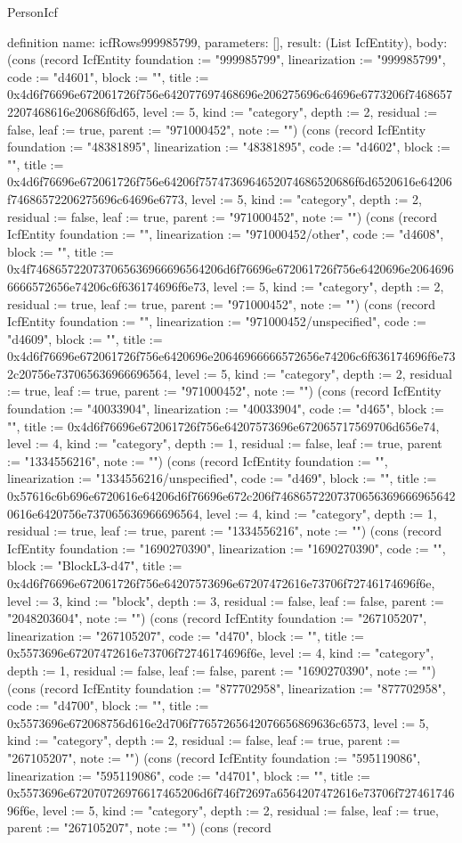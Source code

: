 \begin{lexlean}{PersonIcf}
\begin{semanticmodule}
definition{
  name: icfRows999985799,
  parameters: [],
  result: (List IcfEntity),
  body: (cons (record IcfEntity {foundation := "999985799", linearization := "999985799", code := "d4601", block := "", title := 0x4d6f76696e672061726f756e642077697468696e206275696c64696e6773206f74686572207468616e20686f6d65, level := 5, kind := "category", depth := 2, residual := false, leaf := true, parent := "971000452", note := ""}) (cons (record IcfEntity {foundation := "48381895", linearization := "48381895", code := "d4602", block := "", title := 0x4d6f76696e672061726f756e64206f7574736964652074686520686f6d6520616e64206f74686572206275696c64696e6773, level := 5, kind := "category", depth := 2, residual := false, leaf := true, parent := "971000452", note := ""}) (cons (record IcfEntity {foundation := "", linearization := "971000452/other", code := "d4608", block := "", title := 0x4f7468657220737065636966696564206d6f76696e672061726f756e6420696e20646966666572656e74206c6f636174696f6e73, level := 5, kind := "category", depth := 2, residual := true, leaf := true, parent := "971000452", note := ""}) (cons (record IcfEntity {foundation := "", linearization := "971000452/unspecified", code := "d4609", block := "", title := 0x4d6f76696e672061726f756e6420696e20646966666572656e74206c6f636174696f6e732c20756e737065636966696564, level := 5, kind := "category", depth := 2, residual := true, leaf := true, parent := "971000452", note := ""}) (cons (record IcfEntity {foundation := "40033904", linearization := "40033904", code := "d465", block := "", title := 0x4d6f76696e672061726f756e64207573696e672065717569706d656e74, level := 4, kind := "category", depth := 1, residual := false, leaf := true, parent := "1334556216", note := ""}) (cons (record IcfEntity {foundation := "", linearization := "1334556216/unspecified", code := "d469", block := "", title := 0x57616c6b696e6720616e64206d6f76696e672c206f746865722073706563696669656420616e6420756e737065636966696564, level := 4, kind := "category", depth := 1, residual := true, leaf := true, parent := "1334556216", note := ""}) (cons (record IcfEntity {foundation := "1690270390", linearization := "1690270390", code := "", block := "BlockL3-d47", title := 0x4d6f76696e672061726f756e64207573696e67207472616e73706f72746174696f6e, level := 3, kind := "block", depth := 3, residual := false, leaf := false, parent := "2048203604", note := ""}) (cons (record IcfEntity {foundation := "267105207", linearization := "267105207", code := "d470", block := "", title := 0x5573696e67207472616e73706f72746174696f6e, level := 4, kind := "category", depth := 1, residual := false, leaf := false, parent := "1690270390", note := ""}) (cons (record IcfEntity {foundation := "877702958", linearization := "877702958", code := "d4700", block := "", title := 0x5573696e672068756d616e2d706f77657265642076656869636c6573, level := 5, kind := "category", depth := 2, residual := false, leaf := true, parent := "267105207", note := ""}) (cons (record IcfEntity {foundation := "595119086", linearization := "595119086", code := "d4701", block := "", title := 0x5573696e672070726976617465206d6f746f72697a6564207472616e73706f72746174696f6e, level := 5, kind := "category", depth := 2, residual := false, leaf := true, parent := "267105207", note := ""}) (cons (record }
\end{semanticmodule}
\end{lexlean}
